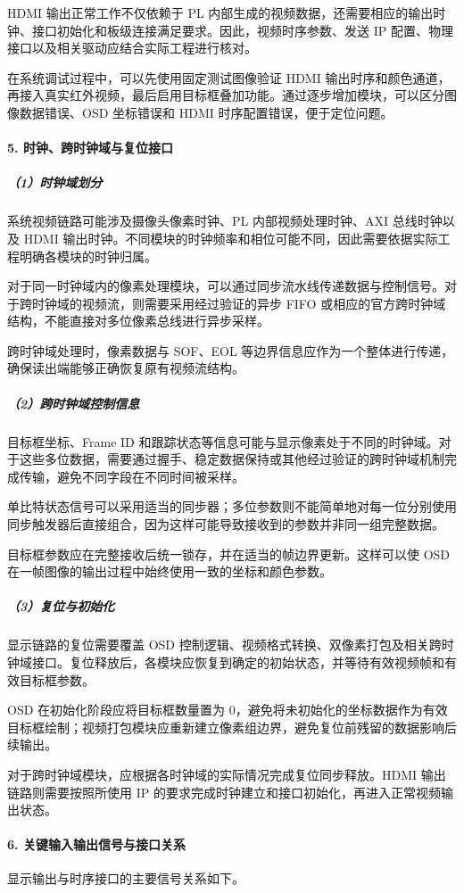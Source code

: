 \documentclass[UTF8,a4paper,12pt,fontset=windows]{ctexart}
\begin{document}
HDMI 输出正常工作不仅依赖于 PL 内部生成的视频数据，还需要相应的输出时钟、接口初始化和板级连接满足要求。因此，视频时序参数、发送 IP 配置、物理接口以及相关驱动应结合实际工程进行核对。

在系统调试过程中，可以先使用固定测试图像验证 HDMI 输出时序和颜色通道，再接入真实红外视频，最后启用目标框叠加功能。通过逐步增加模块，可以区分图像数据错误、OSD 坐标错误和 HDMI 时序配置错误，便于定位问题。

\paragraph*{5. 时钟、跨时钟域与复位接口}
\subparagraph*{（1）时钟域划分}
系统视频链路可能涉及摄像头像素时钟、PL 内部视频处理时钟、AXI 总线时钟以及 HDMI 输出时钟。不同模块的时钟频率和相位可能不同，因此需要依据实际工程明确各模块的时钟归属。

对于同一时钟域内的像素处理模块，可以通过同步流水线传递数据与控制信号。对于跨时钟域的视频流，则需要采用经过验证的异步 FIFO 或相应的官方跨时钟域结构，不能直接对多位像素总线进行异步采样。

跨时钟域处理时，像素数据与 SOF、EOL 等边界信息应作为一个整体进行传递，确保读出端能够正确恢复原有视频流结构。

\subparagraph*{（2）跨时钟域控制信息}
目标框坐标、Frame ID 和跟踪状态等信息可能与显示像素处于不同的时钟域。对于这些多位数据，需要通过握手、稳定数据保持或其他经过验证的跨时钟域机制完成传输，避免不同字段在不同时间被采样。

单比特状态信号可以采用适当的同步器；多位参数则不能简单地对每一位分别使用同步触发器后直接组合，因为这样可能导致接收到的参数并非同一组完整数据。

目标框参数应在完整接收后统一锁存，并在适当的帧边界更新。这样可以使 OSD 在一帧图像的输出过程中始终使用一致的坐标和颜色参数。

\subparagraph*{（3）复位与初始化}
显示链路的复位需要覆盖 OSD 控制逻辑、视频格式转换、双像素打包及相关跨时钟域接口。复位释放后，各模块应恢复到确定的初始状态，并等待有效视频帧和有效目标框参数。

OSD 在初始化阶段应将目标框数量置为 0，避免将未初始化的坐标数据作为有效目标框绘制；视频打包模块应重新建立像素组边界，避免复位前残留的数据影响后续输出。

对于跨时钟域模块，应根据各时钟域的实际情况完成复位同步释放。HDMI 输出链路则需要按照所使用 IP 的要求完成时钟建立和接口初始化，再进入正常视频输出状态。

\paragraph*{6. 关键输入输出信号与接口关系}
显示输出与时序接口的主要信号关系如下。
\end{document}
